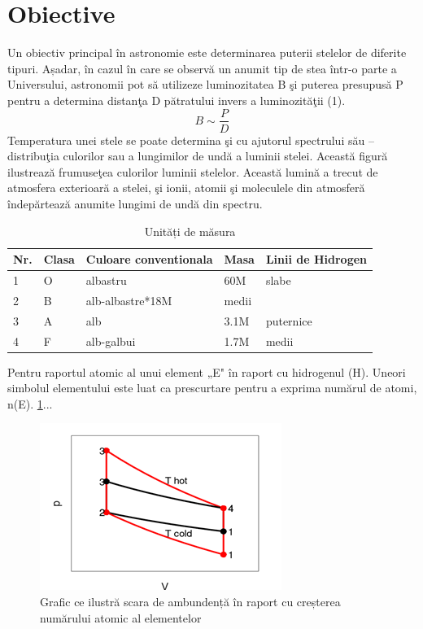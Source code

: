 \documentclass{article}
\begin{document}
\section{Obiective}
	Un obiectiv principal în astronomie este determinarea puterii stelelor de diferite tipuri. Așadar, în cazul în care se observă un anumit tip de stea într-o parte a Universului, astronomii pot să utilizeze luminozitatea B şi puterea presupusă P pentru a determina distanţa D pătratului invers a luminozităţii (1).
\begin{equation}
	B\sim\frac{P}{D}
\end{equation}
	Temperatura unei stele se poate determina şi cu ajutorul spectrului său – distribuţia culorilor sau a lungimilor de undă a luminii stelei. Această figură ilustrează frumuseţea culorilor luminii stelelor. Această lumină a trecut de atmosfera exterioară a stelei, şi ionii, atomii şi moleculele din atmosferă îndepărtează anumite lungimi de undă din spectru.
\begin{table}[htbp]
\centering
\caption{Unități de măsura}\label{tab:unit}
\begin{tabular}{lllll}
\hline
Nr.&Clasa&Culoare conventionala&Masa&Linii de Hidrogen\\\hline
1 &O&albastru&60M&slabe\\\hline
2&B &alb-albastre*18M&medii\\\hline
3&A&alb&3.1M&puternice\\\hline
4&F&alb-galbui&1.7M&medii
\end{tabular}
\end{table}
Pentru raportul atomic al unui element „E" în raport cu hidrogenul (H). Uneori simbolul elementului este luat ca prescurtare pentru a exprima numărul de atomi, n(E). \ref{fig:figura}...
\begin{figure}[ht]
\centering
\includegraphics[bb=50 50 50 50]{Picture1.png}
\caption{Grafic ce ilustră scara de ambundență în raport cu creșterea numărului atomic al elementelor}\label{fig:figura}
\end{figure}
\end{document}
